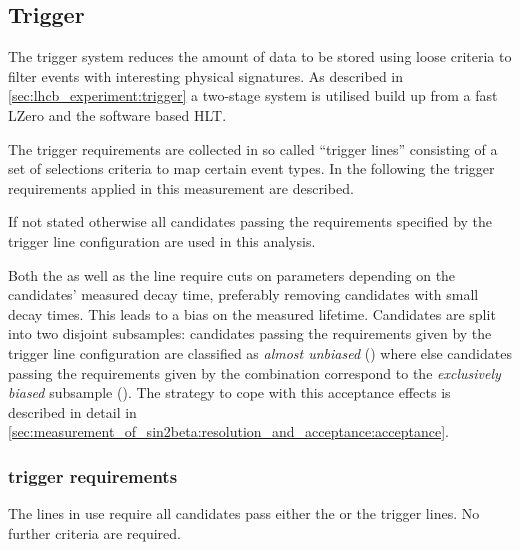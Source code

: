 \subsection{Trigger}
\label{sec:measurement_of_sin2beta:data_preparation:trigger}

The \LHCb trigger system reduces the amount of data to be stored using loose
criteria to filter events with interesting physical signatures. As described in
\cref{sec:lhcb_experiment:trigger} a two-stage system is utilised build up from
a fast \acf{LZero} and the software based \acf{HLT}.

The trigger requirements are collected in so called \enquote{trigger lines}
consisting of a set of selections criteria to map certain event types. In the
following the trigger requirements applied in this measurement are described.

If not stated otherwise all candidates passing the requirements specified by the
trigger line configuration \TriggerReq are used in this analysis.

Both the \HLTOneTrackMuon as well as the \HLTTwoDiMuonDetachedJpsi line require
cuts on parameters depending on the candidates' measured decay time, preferably
removing candidates with small decay times. This leads to a bias on the measured
lifetime. Candidates are split into two disjoint subsamples: candidates passing
the requirements given by the trigger line configuration \TriggerReqAU are
classified as \emph{almost unbiased} (\textbf{\catAU}) where else candidates
passing the requirements given by the combination \TriggerReqEB correspond to
the \emph{exclusively biased} subsample (\textbf{\catEB}). The strategy to cope
with this acceptance effects is described in detail in
\cref{sec:measurement_of_sin2beta:resolution_and_acceptance:acceptance}.

\subsubsection{\LZero trigger requirements}
\label{sec:measurement_of_sin2beta:data_preparation:trigger:lzero}

The \HLT lines in use require all candidates pass either the \LZeroMuon or the
\LZeroDiMuon trigger lines. No further \LZero criteria are required.


